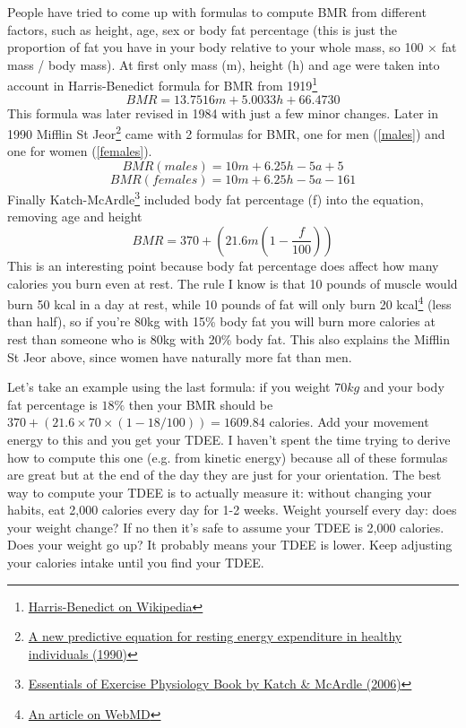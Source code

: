 \documentclass[openany, 12pt]{book}
\begin{document}
	People have tried to come up with formulas to compute BMR from different factors, such as height, age, sex or body fat percentage (this is just
	the proportion of fat you have in your body relative to your whole mass, so 100 $\times$ fat mass / body mass). At first only mass (m), height (h) 
	and age were taken into account in Harris-Benedict formula for BMR from 1919\footnote{\href{
	https://en.wikipedia.org/wiki/Harris\%E2\%80\%93Benedict_equation}{Harris-Benedict on Wikipedia}}
	\begin{equation}
		BMR = 13.7516m + 5.0033h + 66.4730
	\end{equation}
  	This formula was later revised in 1984 with just a few minor changes. Later in 1990 Mifflin St Jeor\footnote{\href{https://pubmed.ncbi.nlm.nih.gov/2305711/}{A new predictive equation for resting energy expenditure in healthy individuals (1990)}} came with 2 formulas for BMR, one for men (\ref{males}) and one for women (\ref{females}).
	\begin{equation}
		\label{males}
		BMR (males) = 10m + 6.25h - 5a + 5
	\end{equation}
	\begin{equation}
		\label{females}
		BMR (females) = 10m + 6.25h - 5a - 161
	\end{equation}
	Finally Katch-McArdle\footnote{\href{https://books.google.co.uk/books/about/Essentials_of_Exercise_Physiology.html?id=L4aZIDbmV3oC}{Essentials of Exercise Physiology Book by Katch \& McArdle (2006)}} included body fat percentage (f) into the equation, removing age and height
	\begin{equation}
		BMR = 370 + (21.6m (1 - \frac{f}{100}))
	\end{equation}
	This is an interesting point because body fat percentage does affect how many calories you burn even at rest. The rule I know is that 10 pounds of muscle would burn 50 kcal in a day at rest, while 10 pounds of fat will only burn 20 kcal\footnote{\href{https://www.webmd.com/diet/obesity/features/8-ways-to-burn-calories-and-fight-fat}{An article on WebMD}} (less than half), so if you're 80kg with 15\% body fat you will burn more calories at rest than someone who is 80kg with 20\% body fat. This also explains the Mifflin St Jeor above, since women have naturally more fat than men. 
	
	Let's take an example using the last formula: if you weight $70kg$ and your body fat percentage is $18\%$ then your BMR should be $370 + (21.6 \times 70 \times (1 - 18/100)) = 1609.84$ calories. Add your movement energy to this and you get your TDEE. I haven't spent the time trying to derive how to
	compute this one (e.g. from kinetic energy) because all of these formulas are great but at the end of the day they are just for your orientation.
	The best way to compute your TDEE is to actually measure it: without changing your habits, eat 2,000 calories every day for 1-2 weeks. Weight
	yourself every day: does your weight change? If no then it's safe to assume your TDEE is 2,000 calories. Does your weight go up? It probably means
	your TDEE is lower. Keep adjusting your calories intake until you find your TDEE. 
	
\end{document}
